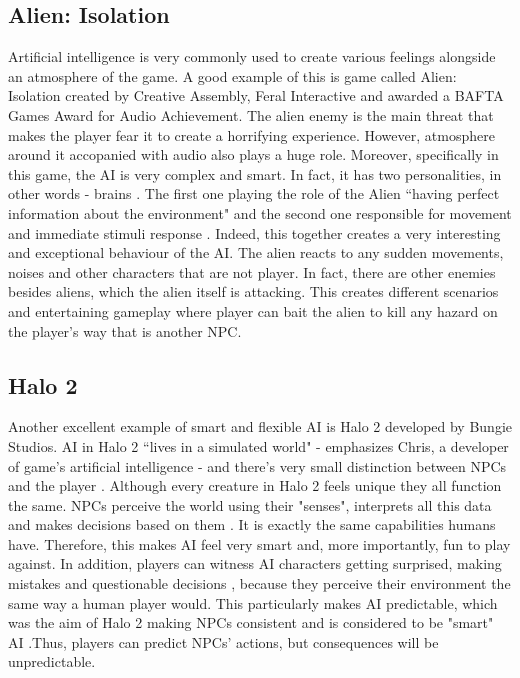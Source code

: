 \documentclass[journal]{IEEEtran}
\begin{document}
\subsection{Alien: Isolation}
Artificial intelligence is very commonly used to create various feelings alongside an atmosphere of the game. A good example of this is game called Alien: Isolation created by Creative Assembly, Feral Interactive and awarded a BAFTA Games Award for Audio Achievement. The alien enemy is the main threat that makes the player fear it to create a horrifying experience. However, atmosphere around it accopanied with audio also plays a huge role. Moreover, specifically in this game, the AI is very complex and smart. In fact, it has two personalities, in other words - brains \cite{seller2019horrific}. The first one playing the role of the Alien ``having perfect information about the environment" \cite{seller2019horrific} and the second one responsible for movement and immediate stimuli response \cite{seller2019horrific}. Indeed, this together creates a very interesting and exceptional behaviour of the AI. The alien reacts to any sudden movements, noises and other characters that are not player. In fact, there are other enemies besides aliens, which the alien itself is attacking. This creates different scenarios and entertaining gameplay where player can bait the alien to kill any hazard on the player's way that is another NPC.

\subsection{Halo 2}
Another excellent example of smart and flexible AI is Halo 2 developed by Bungie Studios. AI in Halo 2 ``lives in a simulated world" \cite{halo2} - emphasizes Chris, a developer of game's artificial intelligence - and there's very small distinction between NPCs and the player \cite{halo2}. Although every creature in Halo 2 feels unique they all function the same. NPCs perceive the world using their "senses", interprets all this data and makes decisions based on them \cite{halo2}. It is exactly the same capabilities humans have. Therefore, this makes AI feel very smart and, more importantly, fun to play against. In addition, players can witness AI characters getting surprised, making mistakes and questionable decisions \cite{halo2}, because they perceive their environment the same way a human player would. This particularly makes AI predictable, which was the aim of Halo 2 making NPCs consistent \cite{halo2} and is considered to be "smart" AI \cite{gamemakertoolkit}.Thus, players can predict NPCs' actions, but consequences will be unpredictable.
\end{document}
